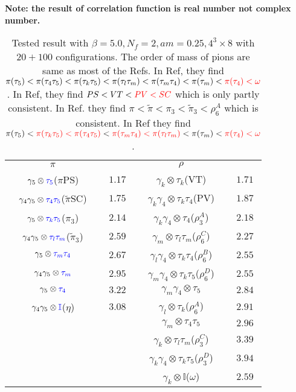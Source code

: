 \textcolor[rgb]{0,0,1}{\textbf{Note: the result of correlation function is real number not complex number.}}


\begin{table}
\begin{center}
\begin{tabular}{cc|cc}
\hline
 $\pi$ & & $\rho$ & \\
$\gamma_5 \otimes \textcolor[rgb]{0,0,1}{\tau _5}$($\pi$PS) & $1.17$ & $\gamma_k\otimes \tau_k$(VT) & $1.71$ \\
$\gamma _4\gamma _5\otimes \textcolor[rgb]{0,0,1}{\tau _4\tau _5}$($\tilde{\pi}$SC) & $1.75$ & $\gamma_k\gamma_4\otimes \tau_k\tau_4$(PV) & $1.87$ \\
$\gamma_5 \otimes \textcolor[rgb]{0,0,1}{\tau _k\tau _5}$($\pi_3$) & $2.14$ & $\gamma_k\gamma _4\otimes \tau_4$($\rho_3^A$) & $2.18$ \\
$\gamma _4\gamma_5 \otimes \textcolor[rgb]{0,0,1}{\tau _l\tau _m}$($\tilde{\pi}_3$) & $2.59$ & $\gamma_m\otimes \tau _l\tau_m$($\rho_6^C$) & $2.27$ \\
$\gamma_5 \otimes \textcolor[rgb]{0,0,1}{\tau _m\tau _4}$ & $2.67$ & $\gamma_l\gamma _4\otimes \tau_k\tau _4$($\rho_6^B$) & $2.55$ \\
$\gamma _4\gamma_5 \otimes \textcolor[rgb]{0,0,1}{\tau _m}$ & $2.95$ & $\gamma_m\gamma _4\otimes \tau _k\tau_5$($\rho_6^D$) & $2.55$\\
$\gamma_5 \otimes \textcolor[rgb]{0,0,1}{\tau _4}$ & $3.22$ & $\gamma_m\gamma _4\otimes \tau_5$ & $2.84$\\
$\gamma _4\gamma_5 \otimes \textcolor[rgb]{0,0,1}{\mathbb{I}}$($\eta$) & $3.08$ & $\gamma_l\otimes \tau_k$($\rho_6^A$) & $2.91$ \\
 & & $\gamma_m\otimes \tau _4\tau_5$ & $2.96$ \\
 & & $\gamma_k\otimes \tau_l\tau _m$($\rho_3^C$) & $3.39$ \\
 & & $\gamma_k\gamma _4\otimes \tau_k\tau _5$($\rho_3^D$) & $3.94$ \\
 & & $\gamma_k\otimes \mathbb{I}$($\omega$) & $2.59$ \\
\hline
\end{tabular}
\end{center}
\caption{\label{tab:staggeredMeson2}Tested result with $\beta=5.0,N_f=2,am=0.25,4^3\times 8$ with $20+100$ configurations. The order of mass of pions are same as most of the Refs. In Ref, they find $\pi(\tau _5)<\pi(\tau _4\tau _5)<\pi(\tau _k\tau _5)<\pi(\tau _l\tau _m)<\pi(\tau _m\tau _4)<\pi(\tau _m)<\textcolor[rgb]{1,0,0}{\pi(\tau _4)<\omega}$. In Ref, they find $PS<VT<\textcolor[rgb]{1,0,0}{PV<SC}$ which is only partly consistent. In Ref. they find $\pi < \tilde{\pi} < \pi_3 < \tilde{\pi}_3<\rho_6^A$ which is consistent. In Ref they find $\pi(\tau _5)<\textcolor[rgb]{1,0,0}{\pi(\tau _k\tau _5)<\pi(\tau _4\tau _5)}<\textcolor[rgb]{1,0,0}{\pi(\tau _m\tau _4)<\pi(\tau _l\tau _m)}<\pi(\tau _m)<\textcolor[rgb]{1,0,0}{\pi(\tau _4)<\omega}$.}
\end{table} 